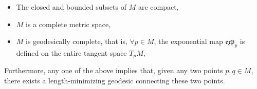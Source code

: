 \documentclass{homework}
\begin{document}
\begin{itemize}
    \item The closed and bounded subsets of $M$ are compact,
    \item $M$ is a complete metric space, 
    \item $M$ is geodesically complete, that is, $\forall p \in M$, the exponential map $\mathfrak{e}\mathfrak{x}\mathfrak{p}_{p}$ is defined on the entire tangent space $T_p M$,
\end{itemize}

Furthermore, any one of the above implies that, given any two points $p, q \in M$, there exists a length-minimizing geodesic connecting these two points. \\
\end{document}
